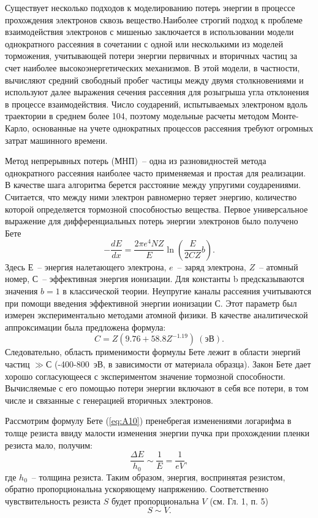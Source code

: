 Существует несколько подходов к моделированию потерь энергии в процессе прохождения электронов сквозь вещество.Наиболее строгий подход к проблеме взаимодействия электронов с мишенью заключается в использовании модели однократного рассеяния	в сочетании с одной или несколькими из моделей торможения, учитывающей потери энергии первичных и вторичных частиц за счет наиболее высокоэнергетических механизмов.
В этой модели, в частности, вычисляют средний свободный пробег частицы между двумя столкновениями и используют далее выражения сечения рассеяния для розыгрыша угла отклонения в процессе взаимодействия. Число соударений, испытываемых электроном вдоль траектории в среднем более 104, поэтому модельные расчеты методом Монте-Карло, основанные на учете однократных процессов рассеяния требуют огромных затрат машинного времени.

Метод непрерывных потерь (МНП)~-- одна из разновидностей метода однократного рассеяния наиболее часто применяемая и простая для реализации. В качестве шага алгоритма берется расстояние между упругими соударениями. Считается, что между ними электрон равномерно теряет энергию, количество которой определяется тормозной способностью вещества.
Первое универсальное выражение для дифференциальных потерь энергии электронов было получено Бете
\begin{equation}
-\frac{dE}{dx}=\frac{2\pi e^4 NZ}{E} \ln \left(\frac{E}{2CZ}b\right).
\label{eq:A10}
\end{equation}
Здесь $Е$~-- энергия налетающего электрона, $e$~-- заряд электрона, $Z$~-- атомный номер, $С$~-- эффективная энергия ионизации. Для константы b предсказываются значения $b = 1$ в классической теории. Неупругие каналы рассеяния учитываются при помощи введения эффективной энергии ионизации С. Этот параметр был измерен экспериментально методами атомной физики. В качестве аналитической аппроксимации была предложена формула:
\begin{equation}
C=Z\left(9.76+58.8Z^{-1.19}\right)~(\text{эВ}).
\label{eq:A11}
\end{equation}
Следовательно, область применимости формулы Бете лежит в области энергий частиц $\gg С$  (-400-800~эВ, в зависимости от материала образца). Закон Бете дает хорошо согласующееся с экспериментом значение тормозной способности. Вычисляемые с его помощью потери энергии включают в себя все потери, в том числе и связанные с генерацией вторичных электронов.

Рассмотрим формулу Бете (\ref{eq:A10}) пренебрегая изменениями логарифма в толще резиста ввиду малости изменения энергии пучка при прохождении пленки резиста мало, получим:
\begin{equation}
    \frac{\Delta E}{h_0} \sim \frac{1}{E} = \frac{1}{eV},
\end{equation}
где $h_0$~-- толщина резиста. Таким образом, энергия, воспринятая резистом, обратно пропорциональна ускоряющему напряжению. Соответственно чувствительность резиста $S$ будет пропорциональна $V$ (см. Гл. 1, п. 5)
\begin{equation}
    S \sim V.
\end{equation}

